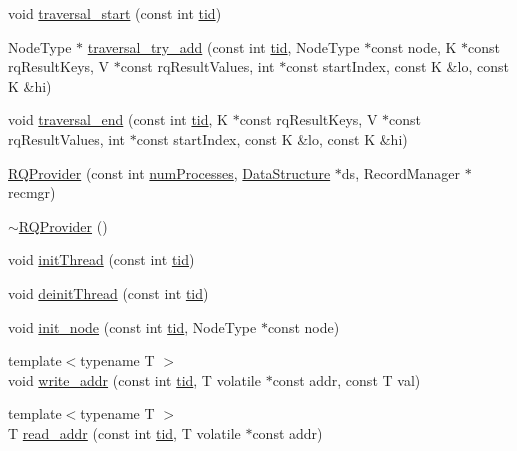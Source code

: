 \begin{DoxyCompactItemize}
\item 
void \hyperlink{classRQProvider_a96fe481c7ba6b30efbd90ac1eca1e788}{traversal\+\_\+start} (const int \hyperlink{microbench_2main_8cpp_a9ca9869868fe7e7a38a921cc7de4103f}{tid})
\item 
Node\+Type $\ast$ \hyperlink{classRQProvider_a3461245aef9265289c85568cfe14af86}{traversal\+\_\+try\+\_\+add} (const int \hyperlink{microbench_2main_8cpp_a9ca9869868fe7e7a38a921cc7de4103f}{tid}, Node\+Type $\ast$const node, K $\ast$const rq\+Result\+Keys, V $\ast$const rq\+Result\+Values, int $\ast$const start\+Index, const K \&lo, const K \&hi)
\item 
void \hyperlink{classRQProvider_ad4bbd6a7d5ea8f497a49ba3bbd03f7fc}{traversal\+\_\+end} (const int \hyperlink{microbench_2main_8cpp_a9ca9869868fe7e7a38a921cc7de4103f}{tid}, K $\ast$const rq\+Result\+Keys, V $\ast$const rq\+Result\+Values, int $\ast$const start\+Index, const K \&lo, const K \&hi)
\item 
\hyperlink{classRQProvider_a657b85f70daa72353de19671d40bbc22}{R\+Q\+Provider} (const int \hyperlink{testing_8cpp_aa085812188e21ede75351d88b9b2c30d}{num\+Processes}, \hyperlink{classDataStructure}{Data\+Structure} $\ast$ds, Record\+Manager $\ast$recmgr)
\item 
\hyperlink{classRQProvider_aefeec3df4b02ba85843f8dddd0230df8}{$\sim$\+R\+Q\+Provider} ()
\item 
void \hyperlink{classRQProvider_a3485da4cb5f94a1229cd31578b088f85}{init\+Thread} (const int \hyperlink{microbench_2main_8cpp_a9ca9869868fe7e7a38a921cc7de4103f}{tid})
\item 
void \hyperlink{classRQProvider_a3f20b96dfa5a47d9f59ada98e3322695}{deinit\+Thread} (const int \hyperlink{microbench_2main_8cpp_a9ca9869868fe7e7a38a921cc7de4103f}{tid})
\item 
void \hyperlink{classRQProvider_a2cd517d996a170c029435b638c9cf219}{init\+\_\+node} (const int \hyperlink{microbench_2main_8cpp_a9ca9869868fe7e7a38a921cc7de4103f}{tid}, Node\+Type $\ast$const node)
\item 
{\footnotesize template$<$typename T $>$ }\\void \hyperlink{classRQProvider_a2b627a253e65ffdbba9815d0ac3236cb}{write\+\_\+addr} (const int \hyperlink{microbench_2main_8cpp_a9ca9869868fe7e7a38a921cc7de4103f}{tid}, T volatile $\ast$const addr, const T val)
\item 
{\footnotesize template$<$typename T $>$ }\\T \hyperlink{classRQProvider_aa6dcae307b83ce0dc7890155f81659a2}{read\+\_\+addr} (const int \hyperlink{microbench_2main_8cpp_a9ca9869868fe7e7a38a921cc7de4103f}{tid}, T volatile $\ast$const addr)

\end{DoxyCompactItemize}
